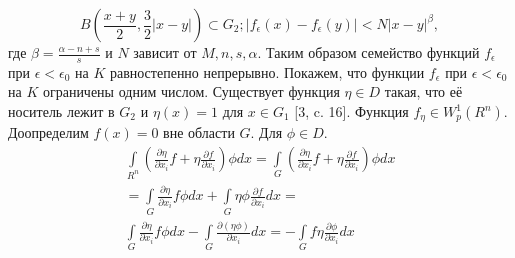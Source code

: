 $$
B\left(\frac{x+y}{2},\frac{3}{2}|x-y|\right)\subset G_{2}; |f_{\epsilon}(x)-f_{\epsilon}(y)|<N|x-y|^\beta,
$$
где $\beta=\frac{\alpha-n+s}{s}$ и $N$ зависит от $M,n,s,\alpha$.
Таким образом семейство функций $f_\epsilon$ при $\epsilon<\epsilon_0$ на $K$ равностепенно непрерывно. Покажем, что функции $f_\epsilon$ при $\epsilon<\epsilon_0$ на $K$ ограничены одним числом. Существует функция $\eta\in D$ такая, что её носитель лежит в $G_2$ и $\eta(x)=1$ для $x\in G_1$ [3, c. 16]. Функция $f_{\eta}\in W_{p}^{1} (R^n)$. Доопределим $f(x)=0$ вне области $G$. Для $\phi\in D$.
\begin{multline}
\int\limits_{R^n}\left(\frac{\partial\eta}{\partial x_i}f+\eta\frac{\partial f}{\partial x_i}\right)\phi dx
= \int\limits_{G}\left(\frac{\partial\eta}{\partial x_i}f+\eta\frac{\partial f}{\partial x_i}\right)\phi dx\\
=\int\limits_{G}\frac{\partial\eta}{\partial x_i}f\phi dx+\int\limits_{G}\eta\phi\frac{\partial f}{\partial x_i}dx=\\
\int\limits_{G}\frac{\partial\eta}{\partial x_i}f\phi dx-\int\limits_{G}\frac{\partial(\eta\phi)}{\partial x_i}dx=-\int\limits_{G}f\eta\frac{\partial\phi}{\partial x_i}dx\\
\end{multline}


